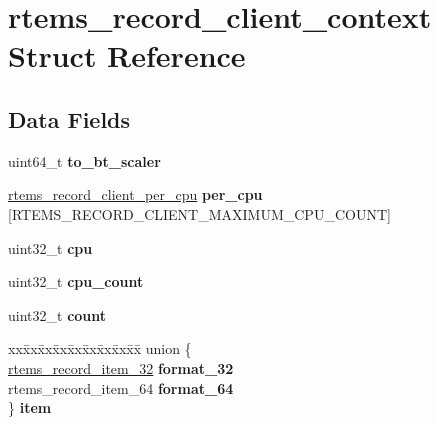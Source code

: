 \hypertarget{structrtems__record__client__context}{}\section{rtems\+\_\+record\+\_\+client\+\_\+context Struct Reference}
\label{structrtems__record__client__context}
\subsection*{Data Fields}
\begin{DoxyCompactItemize}
\item 
\mbox{\label{structrtems__record__client__context_a9479b04ecd1a881808b27e9a58f6af2e}} 
uint64\+\_\+t {\bfseries to\+\_\+bt\+\_\+scaler}
\item 
\mbox{\label{structrtems__record__client__context_a8da6d4d2072c84bc5221a1663bd7c88d}} 
\mbox{\hyperlink{structrtems__record__client__per__cpu}{rtems\+\_\+record\+\_\+client\+\_\+per\+\_\+cpu}} {\bfseries per\+\_\+cpu} \mbox{[}R\+T\+E\+M\+S\+\_\+\+R\+E\+C\+O\+R\+D\+\_\+\+C\+L\+I\+E\+N\+T\+\_\+\+M\+A\+X\+I\+M\+U\+M\+\_\+\+C\+P\+U\+\_\+\+C\+O\+U\+NT\mbox{]}
\item 
\mbox{\label{structrtems__record__client__context_a186fd46036c6c47c3cf908dba08273f8}} 
uint32\+\_\+t {\bfseries cpu}
\item 
\mbox{\label{structrtems__record__client__context_af81475d83603c51a3327bf6b87b4b6db}} 
uint32\+\_\+t {\bfseries cpu\+\_\+count}
\item 
\mbox{\label{structrtems__record__client__context_afab47ab38925dd235f90f80f4e0e0333}} 
uint32\+\_\+t {\bfseries count}
\item 
\mbox{\label{structrtems__record__client__context_a3bc8ab0de7d3f916d0a5e649f7463c38}} 
\begin{tabbing}
xx\=xx\=xx\=xx\=xx\=xx\=xx\=xx\=xx\=\kill
union \{\\
\>\mbox{\hyperlink{structrtems__record__item__32}{rtems\_record\_item\_32}} {\bfseries format\_32}\\
\>rtems\_record\_item\_64 {\bfseries format\_64}\\
\} {\bfseries item}\\


\end{tabbing}
\end{DoxyCompactItemize}
